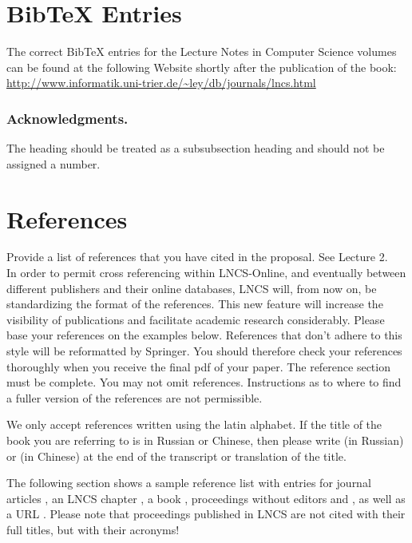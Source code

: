 \documentclass[runningheads,a4paper]{llncs}
\begin{document}
\section{BibTeX Entries}

The correct BibTeX entries for the Lecture Notes in Computer Science
volumes can be found at the following Website shortly after the
publication of the book:
\url{http://www.informatik.uni-trier.de/~ley/db/journals/lncs.html}

\subsubsection*{Acknowledgments.} The heading should be treated as a
subsubsection heading and should not be assigned a number.

\section{References}\label{references}

Provide a list of references that you have cited in the proposal. See Lecture 2.\\


In order to permit cross referencing within LNCS-Online, and eventually
between different publishers and their online databases, LNCS will,
from now on, be standardizing the format of the references. This new
feature will increase the visibility of publications and facilitate
academic research considerably. Please base your references on the
examples below. References that don't adhere to this style will be
reformatted by Springer. You should therefore check your references
thoroughly when you receive the final pdf of your paper.
The reference section must be complete. You may not omit references.
Instructions as to where to find a fuller version of the references are
not permissible.

We only accept references written using the latin alphabet. If the title
of the book you are referring to is in Russian or Chinese, then please write
(in Russian) or (in Chinese) at the end of the transcript or translation
of the title.

The following section shows a sample reference list with entries for
journal articles \cite{jour}, an LNCS chapter \cite{lncschap}, a book
\cite{book}, proceedings without editors \cite{proceeding1} and
\cite{proceeding2}, as well as a URL \cite{url}.
Please note that proceedings published in LNCS are not cited with their
full titles, but with their acronyms!
\end{document}
